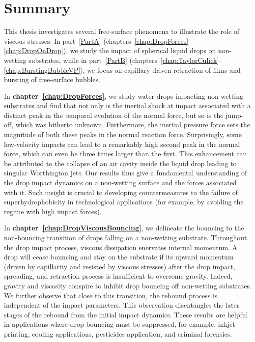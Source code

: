\chapter{Summary}

This thesis investigates several free-surface phenomena to illustrate the role of viscous stresses. In part~\ref{PartA} (chapters~\ref{chap:DropForces}--\ref{chap:DropOnDrop}), we study the impact of spherical liquid drops on non-wetting substrates, while in part~\ref{PartB} (chapters~\ref{chap:TaylorCulick}--\ref{chap:BurstingBubbleVP}), we focus on capillary-driven retraction of films and bursting of free-surface bubbles. 

In \textbf{chapter~\ref{chap:DropForces}}, we study water drops impacting non-wetting substrates and find that not only is the inertial shock at impact associated with a distinct peak in the temporal evolution of the normal force, but so is the jump-off, which was hitherto unknown. Furthermore, the inertial pressure force sets the magnitude of both these peaks in the normal reaction force. Surprisingly, some low-velocity impacts can lead to a remarkably high second peak in the normal force, which can even be three times larger than the first. This enhancement can be attributed to the collapse of an air cavity inside the liquid drop leading to singular Worthington jets. Our results thus give a fundamental understanding of the drop impact dynamics on a non-wetting surface and the forces associated with it. Such insight is crucial to developing countermeasures to the failure of superhydrophobicity in technological applications (for example, by avoiding the regime with high impact forces).

In \textbf{chapter~\ref{chap:DropViscousBouncing}}, we delineate the bouncing to the non-bouncing transition of drops falling on a non-wetting substrate. Throughout the drop impact process, viscous dissipation enervates internal momentum. A drop will cease bouncing and stay on the substrate if its upward momentum (driven by capillarity and resisted by viscous stresses) after the drop impact, spreading, and retraction process is insufficient to overcome gravity. Indeed, gravity and viscosity conspire to inhibit drop bouncing off non-wetting substrates. We further observe that close to this transition, the rebound process is independent of the impact parameters. This observation disentangles the later stages of the rebound from the initial impact dynamics. These results are helpful in applications where drop bouncing must be suppressed, for example, inkjet printing, cooling applications, pesticides application, and criminal forensics.

